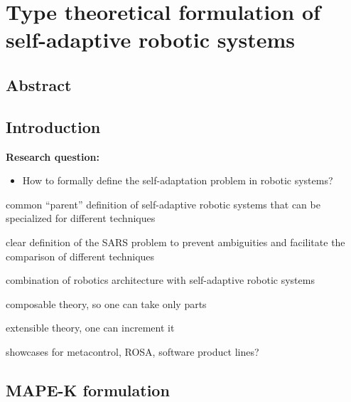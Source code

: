 \chapter{Type theoretical formulation of self-adaptive robotic systems}
\label{type}

\begin{abstract}
Sample Abstract.
\end{abstract}


\section{Abstract}

\section{Introduction}

\textbf{Research question:} 
\begin{itemize}
    \item How to formally define the self-adaptation problem in robotic systems? 
\end{itemize}


common ``parent'' definition of self-adaptive robotic systems that can be specialized for different techniques

clear definition of the SARS problem to prevent ambiguities and facilitate the comparison of different techniques

combination of robotics architecture with self-adaptive robotic systems

composable theory, so one can take only parts

extensible theory, one can increment it

showcases for metacontrol, ROSA, software product lines?


\section{MAPE-K formulation}

